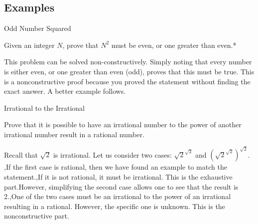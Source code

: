 \subsection{Examples}
\begin{namedframe}{Odd Number Squared}
	\begin{example}
		Given an integer $N$, prove that $N^2$ must be even, or one greater than even.*	
	\end{example}
	\pause
	This problem can be solved non-constructively. Simply noting that every number is either even, or one greater than even (odd), proves that this must be true. This is a nonconstructive proof because you proved the statement without finding the exact answer. A better example follows.
\end{namedframe}
\begin{namedframe}{Irrational to the Irrational}
	\begin{example}
		Prove that it is possible to have an irrational number to the power of another irrational number result in a rational number.
	\end{example}
	\pause
	Recall that $\sqrt{2}$ is irrational. Let us consider two cases: $\sqrt{2}^{\sqrt{2}}$ and $(\sqrt{2}^{\sqrt{2}})^{\sqrt{2}}$. \sep If the first case is rational, then we have found an example to match the statement.\sep If it is not rational, it must be irrational. This is the exhaustive part.\pause However, simplifying the second case allows one to see that the result is 2.\sep One of the two cases must be an irrational to the power of an irrational resulting in a rational. However, the specific one is unknown. This is the nonconstructive part.
\end{namedframe}